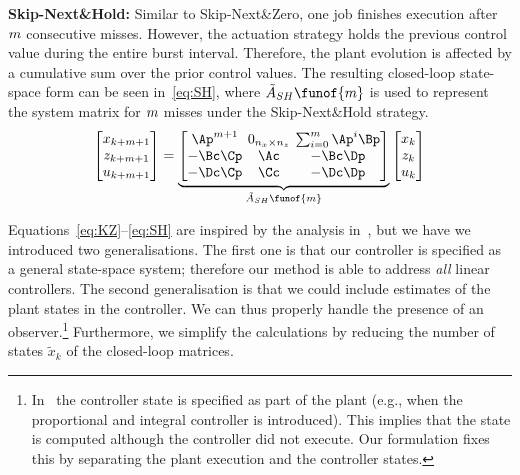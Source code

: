 \textbf{Skip-Next\&Hold: }%
%
Similar to Skip-Next\&Zero, one job finishes execution after $m$ consecutive misses.
However, the actuation strategy holds the previous control value during the entire burst interval.
Therefore, the plant evolution is affected by a cumulative sum over the prior control values.
The resulting closed-loop state-space form can be seen in~\eqref{eq:SH}, where $\tilde A_{SH}\funof{\nummisses}$ is used to represent the system matrix for $m$ misses under the Skip-Next\&Hold strategy.
%
\begin{equation}
\setlength\arraycolsep{2pt}
\label{eq:SH}
    \begin{bmatrix}
        x_{k+\nummisses+1} \\
        z_{k+\nummisses+1} \\
        u_{k+\nummisses+1}
    \end{bmatrix} = 
    \underbrace{\begin{bmatrix}
        \Ap^{\nummisses+1}  & 0_{n_x \times n_z}  & \sum_{i=0}^\nummisses \Ap^i\Bp \\
        -\Bc\Cp             & \Ac                                       & -\Bc\Dp \\
        -\Dc\Cp             & \Cc                                       & -\Dc\Dp
    \end{bmatrix}}_{\tilde A_{SH}\funof{\nummisses}}
    \begin{bmatrix}
        x_{k} \\
        z_{k} \\
        u_{k}
    \end{bmatrix}
\end{equation}

Equations~\eqref{eq:KZ}--\eqref{eq:SH} are inspired by the analysis in~\cite{Maggio:2020}, but we have we introduced two generalisations.
The first one is that our controller is specified as a general state-space system; therefore our method is able to address \emph{all} linear controllers.
The second generalisation is that we could include estimates of the plant states in the controller.
We can thus properly handle the presence of an observer.\footnote{In~\cite{Maggio:2020} the controller state is specified as part of the plant (e.g., when the proportional and integral controller is introduced). This implies that the state is computed although the controller did not execute. Our formulation fixes this by separating the plant execution and the controller states.}
Furthermore, we simplify the calculations by reducing the number of states $\tilde{x}_k$ of the closed-loop matrices.

